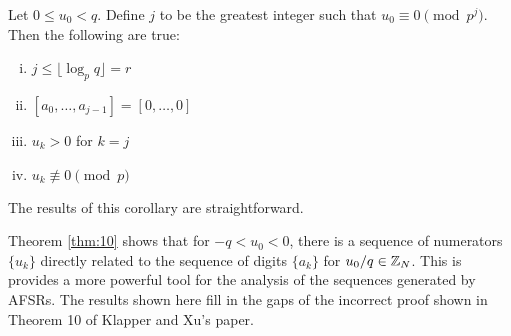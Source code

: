 \begin{corollary}\label{cor:aj}
  Let $0\leq u_0 < q$. Define $j$ to be the greatest integer such that
  $u_0 \equiv 0 \pmod p^j$. Then the following are true:
  \begin{enumerate}[i.]
    \item $j\leq\lfloor\log_p{q}\rfloor = r$
    \item $[a_0,\dots,a_{j-1}]=[0,\dots,0]$
    \item $u_k>0$ for $k=j$
    \item $u_k \not\equiv 0 \pmod p$
  \end{enumerate}
\end{corollary}
\par The results of this corollary are straightforward.

\par Theorem \ref{thm:10} shows that for $-q<u_0<0$, there is a sequence of
numerators $\{u_k\}$ directly related to the sequence of digits $\{a_k\}$
for $u_0/q\in\mathbb{Z}_N$. This is provides a more powerful tool for the analysis
of the sequences generated by AFSRs. The results shown here fill in the gaps of
the incorrect proof shown in Theorem 10 of Klapper and Xu's paper.
